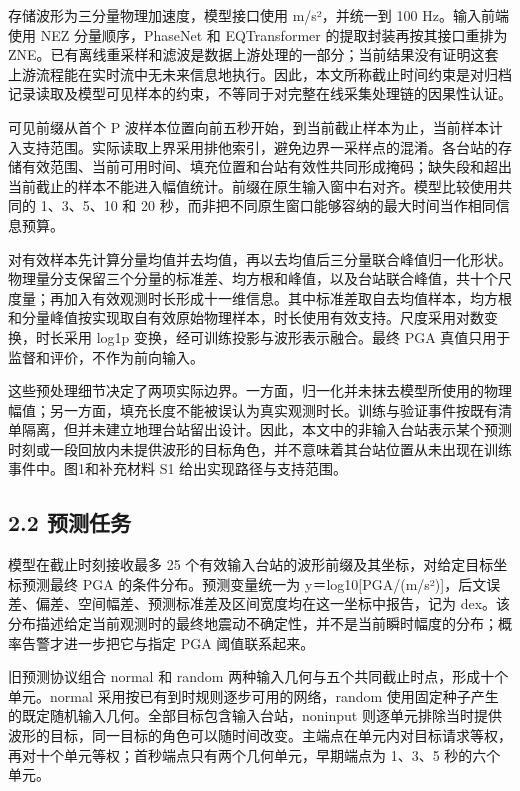 \documentclass[UTF8,a4paper,11pt]{ctexart}
\begin{document}
存储波形为三分量物理加速度，模型接口使用 m/s²，并统一到 100 Hz。输入前端使用 NEZ 分量顺序，PhaseNet 和 EQTransformer 的提取封装再按其接口重排为 ZNE。已有离线重采样和滤波是数据上游处理的一部分；当前结果没有证明这套上游流程能在实时流中无未来信息地执行。因此，本文所称截止时间约束是对归档记录读取及模型可见样本的约束，不等同于对完整在线采集处理链的因果性认证。

可见前缀从首个 P 波样本位置向前五秒开始，到当前截止样本为止，当前样本计入支持范围。实际读取上界采用排他索引，避免边界一采样点的混淆。各台站的存储有效范围、当前可用时间、填充位置和台站有效性共同形成掩码；缺失段和超出当前截止的样本不能进入幅值统计。前缀在原生输入窗中右对齐。模型比较使用共同的 1、3、5、10 和 20 秒，而非把不同原生窗口能够容纳的最大时间当作相同信息预算。

对有效样本先计算分量均值并去均值，再以去均值后三分量联合峰值归一化形状。物理量分支保留三个分量的标准差、均方根和峰值，以及台站联合峰值，共十个尺度量；再加入有效观测时长形成十一维信息。其中标准差取自去均值样本，均方根和分量峰值按实现取自有效原始物理样本，时长使用有效支持。尺度采用对数变换，时长采用 log1p 变换，经可训练投影与波形表示融合。最终 PGA 真值只用于监督和评价，不作为前向输入。

这些预处理细节决定了两项实际边界。一方面，归一化并未抹去模型所使用的物理幅值；另一方面，填充长度不能被误认为真实观测时长。训练与验证事件按既有清单隔离，但并未建立地理台站留出设计。因此，本文中的非输入台站表示某个预测时刻或一段回放内未提供波形的目标角色，并不意味着其台站位置从未出现在训练事件中。图1和补充材料 S1 给出实现路径与支持范围。

\subsection*{2.2 预测任务}

模型在截止时刻接收最多 25 个有效输入台站的波形前缀及其坐标，对给定目标坐标预测最终 PGA 的条件分布。预测变量统一为 y＝log10[PGA/(m/s²)]，后文误差、偏差、空间幅差、预测标准差及区间宽度均在这一坐标中报告，记为 dex。该分布描述给定当前观测时的最终地震动不确定性，并不是当前瞬时幅度的分布；概率告警才进一步把它与指定 PGA 阈值联系起来。

旧预测协议组合 normal 和 random 两种输入几何与五个共同截止时点，形成十个单元。normal 采用按已有到时规则逐步可用的网络，random 使用固定种子产生的既定随机输入几何。全部目标包含输入台站，noninput 则逐单元排除当时提供波形的目标，同一目标的角色可以随时间改变。主端点在单元内对目标请求等权，再对十个单元等权；首秒端点只有两个几何单元，早期端点为 1、3、5 秒的六个单元。
\end{document}
